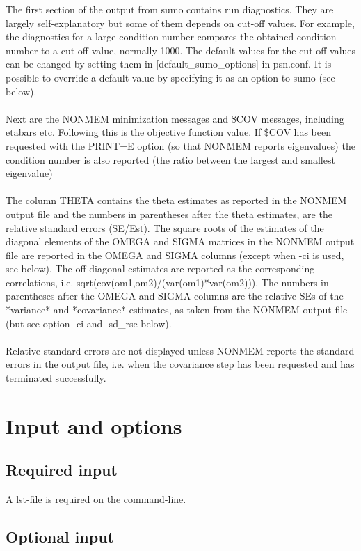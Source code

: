 \documentclass[a4paper,12pt]{article}
\begin{document}
The first section of the output from sumo contains run diagnostics. They are largely self-explanatory but some of them depends on cut-off values. For example, the diagnostics for a large condition number compares the obtained condition number to a cut-off value, normally 1000. The default values for the cut-off values can be changed by setting them in [default\_sumo\_options] in psn.conf. It is possible to override a default value by specifying it as an option to sumo (see below).
\\
\\ 
Next are the NONMEM minimization messages and \$COV messages, including etabars etc. Following this is the objective function value. If \$COV has been requested with the PRINT=E option (so that NONMEM reports eigenvalues) the condition number is also reported (the ratio between the largest and smallest eigenvalue)
\\
\\
The column THETA contains the theta estimates as reported in the NONMEM output file and the numbers in parentheses after the theta estimates, are the relative standard errors (SE/Est). The square    roots of the estimates of the diagonal elements of the OMEGA and SIGMA matrices in the NONMEM output file are reported in the OMEGA and SIGMA columns (except when -ci is used, see below). The off-diagonal estimates are reported as the corresponding correlations, i.e. sqrt(cov(om1,om2)/(var(om1)*var(om2))). The numbers in parentheses after the OMEGA and SIGMA columns are the relative SEs of the *variance* and *covariance* estimates, as taken from the NONMEM output file (but see option -ci and -sd\_rse below).
\\
\\
Relative standard errors are not displayed unless NONMEM reports the standard errors in the output file, i.e. when the covariance step has been requested and has terminated successfully.



\section{Input and options}

\subsection{Required input}
A lst-file is required on the command-line.

\subsection{Optional input}
\end{document}
